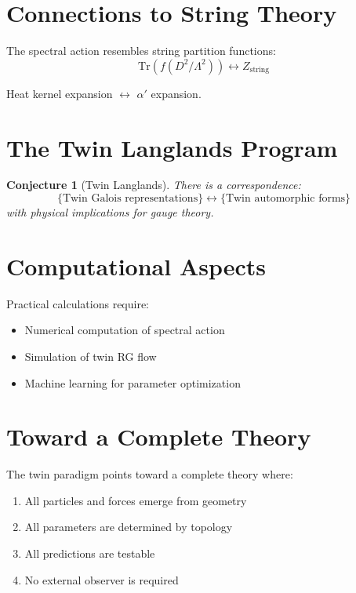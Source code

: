 \documentclass[11pt,a4paper,openright]{book}
\theoremstyle{plain}
\newtheorem{conjecture}[theorem]{Conjecture}
\theoremstyle{definition}
\newcommand{\Tr}{\mathrm{Tr}}
\newcommand{\Lam}{\Lambda}
\begin{document}
\section{Connections to String Theory}

The spectral action resembles string partition functions:
\begin{equation}
\Tr(f(D^2/\Lam^2)) \leftrightarrow Z_{\mathrm{string}}
\end{equation}

Heat kernel expansion $\leftrightarrow$ $\alpha'$ expansion.

\section{The Twin Langlands Program}

\begin{conjecture}[Twin Langlands]
There is a correspondence:
\begin{equation}
\{\text{Twin Galois representations}\} \leftrightarrow \{\text{Twin automorphic forms}\}
\end{equation}
with physical implications for gauge theory.
\end{conjecture}

\section{Computational Aspects}

Practical calculations require:
\begin{itemize}
    \item Numerical computation of spectral action
    \item Simulation of twin RG flow
    \item Machine learning for parameter optimization
\end{itemize}

\section{Toward a Complete Theory}

The twin paradigm points toward a complete theory where:

\begin{enumerate}
    \item All particles and forces emerge from geometry
    \item All parameters are determined by topology
    \item All predictions are testable
    \item No external observer is required
\end{enumerate}
\end{document}
